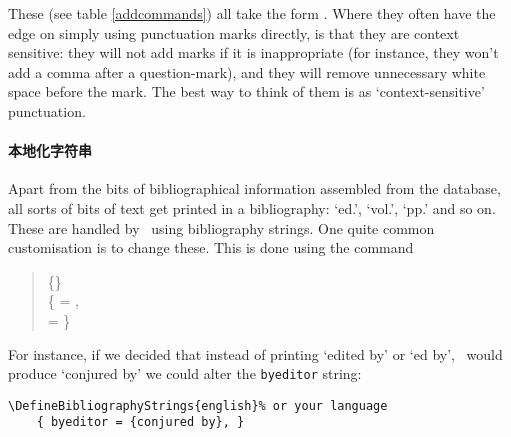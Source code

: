 These (see table \ref{addcommands}) all take the form
. Where they often have the edge on simply using
punctuation marks directly, is that they are context sensitive: they
will not add marks if it is inappropriate (for instance, they won't
add a comma after a question-mark), and they will remove unnecessary
white space before the mark. The best way to think of them is as
`context-sensitive' punctuation.

\paragraph{本地化字符串} Apart from the bits
of bibliographical information
assembled from the database, all sorts of bits of text get printed in
a bibliography: `ed.', `vol.', `pp.'  and so on. These are handled by
\biblatex\ using bibliography strings. One quite common customisation
is to change these. This is done using the command
\begin{quotation}
\ttfamily
{}%
  \{\}\\%
  \quad\{ = ,\\
  \quad {} =  \}
\end{quotation} For
instance, if we decided that instead of printing `edited by' or `ed
by', \biblatex\ would produce `conjured by' we could alter the
\verb|byeditor| string:
\begin{verbatim}
\DefineBibliographyStrings{english}% or your language
    { byeditor = {conjured by}, }
\end{verbatim}

